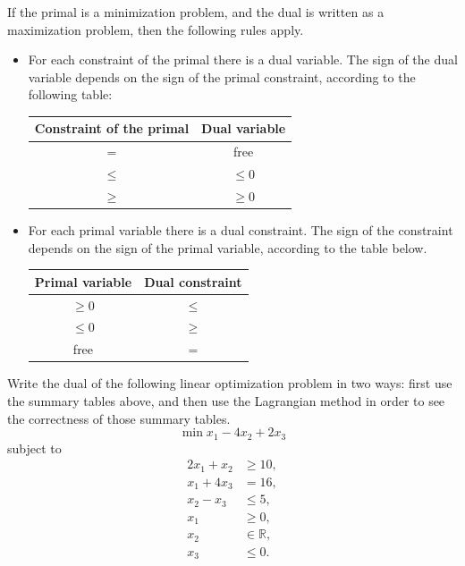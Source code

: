 
If the primal is a minimization problem, and the dual is written as a
maximization problem, then the following rules apply. 
\begin{itemize}
\item For each constraint of the primal there is a dual variable. The
  sign of the dual variable depends on the sign of the primal constraint, according to the following table:
\begin{center}
\begin{tabular}{c | c}
Constraint of the primal & Dual variable \\
\hline
$=$ & free\\
$\leq$ & $\leq 0$\\
$\geq$ & $\geq 0$
\end{tabular}
\end{center}
\item For each primal variable there is a dual constraint. The sign of
  the constraint depends on the sign of the primal variable, according to the table below.
\begin{center}

\begin{tabular}{c | c}
Primal variable & Dual constraint \\
\hline
$\geq 0$ & $\leq$\\
$\leq 0$ & $\geq$\\
free & $=$
\end{tabular}
\end{center}

\end{itemize}


Write the dual of the following linear optimization problem in two
ways: first use the summary tables above, and then use the Lagrangian
method in order to see the correctness of those summary tables.
\[
\min   x_1 - 4x_2 + 2x_3 
\]
subject to
\begin{align*}
 2x_1 + x_2 &\geq 10, \\
x_1 + 4x_3 &= 16, \\
x_2 - x_3 &\leq 5, \\
x_1 &\geq 0, \\
x_2 &\in \mathbb{R}, \\
x_3 &\leq 0.
\end{align*}


